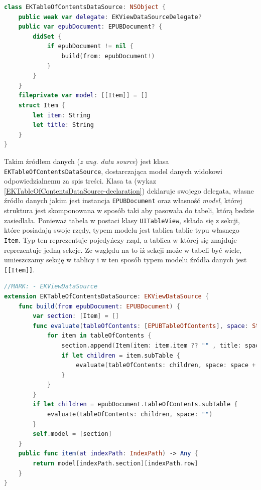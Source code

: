 \begin{lstlisting}[language=swift,caption={Deklaracja klasy \texttt{EKTableOfContentsDataSource}}, label=EKTableOfContentsDataSource-declaration]
class EKTableOfContentsDataSource: NSObject {
    public weak var delegate: EKViewDataSourceDelegate?
    public var epubDocument: EPUBDocument? {
        didSet {
            if epubDocument != nil {
                build(from: epubDocument!)
            }
        }
    }
    fileprivate var model: [[Item]] = []
    struct Item {
        let item: String
        let title: String
    }
}
\end{lstlisting}

Takim źródłem danych (\textit{z ang. data source}) jest klasa \texttt{EKTableOfContentsDataSource}, dostarczająca model danych widokowi odpowiedzialnemu za spis treści. Klasa ta (wykaz \ref{EKTableOfContentsDataSource-declaration}) deklaruje swojego delegata, własne źródło danych jakim jest instancja \texttt{EPUBDocument} oraz własność \textit{model}, której struktura jest skomponowana w sposób taki aby pasowała do tabeli, którą bedzie zasiedlała. Ponieważ tabela w postaci klasy \texttt{UITableView}, składa się z sekcji, które posiadają swoje rzędy, typem modelu jest tablica tablic typu własnego \texttt{Item}. Typ ten reprezentuje pojedyńczy rząd, a tablica w której się znajduje reprezentuje jedną sekcje. Ze względu na to iż sekcji może w tabeli być wiele, umieszczamy sekcję w tablicy i w ten sposób typem modelu źródła danych jest \texttt{[[Item]]}.

\begin{lstlisting}[language=swift,caption={Rozszerzenie klasy \texttt{EKTableOfContentsDataSource} o protokół \texttt{EKViewDataSource}}, label=EKTableOfContentsViewController-extension-1]
//MARK: - EKViewDataSource
extension EKTableOfContentsDataSource: EKViewDataSource {
    func build(from epubDocument: EPUBDocument) {
        var section: [Item] = []
        func evaluate(tableOfContents: [EPUBTableOfContents], space: String) {
            for item in tableOfContents {
                section.append(Item(item: item.item ?? "" , title: space + item.label))
                if let children = item.subTable {
                    evaluate(tableOfContents: children, space: space + "    ")
                }
            }
        }
        if let children = epubDocument.tableOfContents.subTable {
            evaluate(tableOfContents: children, space: "")
        }
        self.model = [section]
    }
    public func item(at indexPath: IndexPath) -> Any {
        return model[indexPath.section][indexPath.row]
    }
}
\end{lstlisting}

